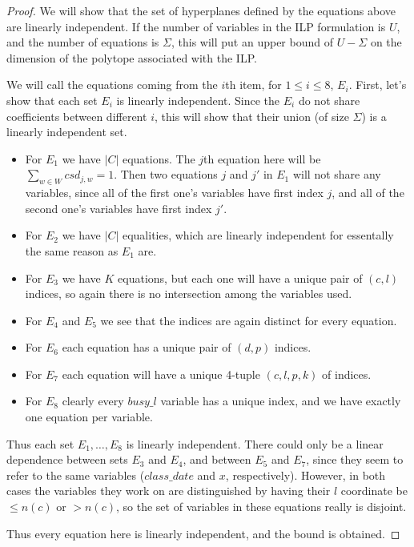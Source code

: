 \begin{proof}
We will show that the set of hyperplanes defined by the equations above are linearly independent. If the number of variables in the ILP formulation is $U$, and the number of equations is $\Sigma$, this will put an upper bound of $U - \Sigma$ on the dimension of the polytope associated with the ILP.

We will call the equations coming from the $i$th item, for $1 \le i \le 8$, $E_i$. First, let's show that each set $E_i$ is linearly independent. Since the $E_i$ do not share coefficients between different $i$, this will show that their union (of size $\Sigma$) is a linearly independent set.

\begin{itemize}
\item For $E_1$ we have $|C|$ equations. The $j$th equation here will be $\sum_{w \in W} csd_{j, w} = 1$. Then two equations $j$ and $j'$ in $E_1$ will not share any variables, since all of the first one's variables have first index $j$, and all of the second one's variables have first index $j'$.

\item For $E_2$ we have $|C|$ equalities, which are linearly independent for essentally the same reason as $E_1$ are.

\item For $E_3$ we have $K$ equations, but each one will have a unique pair of $(c, l)$ indices, so again there is no intersection among the variables used.

\item For $E_4$ and $E_5$  we see that the indices are again distinct for every equation.

\item For $E_6$ each equation has a unique pair of $(d, p)$ indices.

\item For $E_7$ each equation will have a unique 4-tuple $(c, l, p, k)$ of indices.

\item For $E_8$ clearly every $busy\_l$ variable has a unique index, and we have exactly one equation per variable.
\end{itemize}

Thus each set $E_1, \dots, E_8$ is linearly independent. There could only be a linear dependence between sets $E_3$ and $E_4$, and between $E_5$ and $E_7$, since they seem to refer to the same variables ($class\_date$ and $x$, respectively). However, in both cases the variables they work on are distinguished by having their $l$ coordinate be $\le n(c)$ or $> n(c)$, so the set of variables in these equations really is disjoint.

Thus every equation here is linearly independent, and the bound is obtained.
\end{proof}

